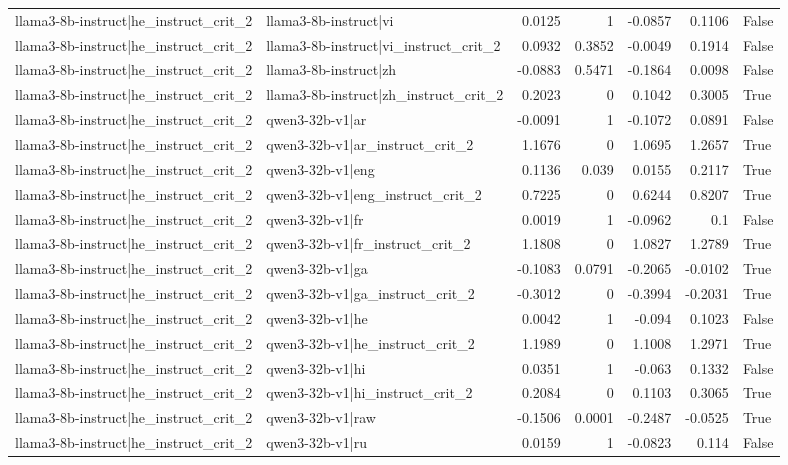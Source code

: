 \begin{table}
\begin{tabular}{l l r r r r l}
llama3-8b-instruct|he_instruct_crit_2 & llama3-8b-instruct|vi & 0.0125 & 1 & -0.0857 & 0.1106 & False \\
llama3-8b-instruct|he_instruct_crit_2 & llama3-8b-instruct|vi_instruct_crit_2 & 0.0932 & 0.3852 & -0.0049 & 0.1914 & False \\
llama3-8b-instruct|he_instruct_crit_2 & llama3-8b-instruct|zh & -0.0883 & 0.5471 & -0.1864 & 0.0098 & False \\
llama3-8b-instruct|he_instruct_crit_2 & llama3-8b-instruct|zh_instruct_crit_2 & 0.2023 & 0 & 0.1042 & 0.3005 & True \\
llama3-8b-instruct|he_instruct_crit_2 & qwen3-32b-v1|ar & -0.0091 & 1 & -0.1072 & 0.0891 & False \\
llama3-8b-instruct|he_instruct_crit_2 & qwen3-32b-v1|ar_instruct_crit_2 & 1.1676 & 0 & 1.0695 & 1.2657 & True \\
llama3-8b-instruct|he_instruct_crit_2 & qwen3-32b-v1|eng & 0.1136 & 0.039 & 0.0155 & 0.2117 & True \\
llama3-8b-instruct|he_instruct_crit_2 & qwen3-32b-v1|eng_instruct_crit_2 & 0.7225 & 0 & 0.6244 & 0.8207 & True \\
llama3-8b-instruct|he_instruct_crit_2 & qwen3-32b-v1|fr & 0.0019 & 1 & -0.0962 & 0.1 & False \\
llama3-8b-instruct|he_instruct_crit_2 & qwen3-32b-v1|fr_instruct_crit_2 & 1.1808 & 0 & 1.0827 & 1.2789 & True \\
llama3-8b-instruct|he_instruct_crit_2 & qwen3-32b-v1|ga & -0.1083 & 0.0791 & -0.2065 & -0.0102 & True \\
llama3-8b-instruct|he_instruct_crit_2 & qwen3-32b-v1|ga_instruct_crit_2 & -0.3012 & 0 & -0.3994 & -0.2031 & True \\
llama3-8b-instruct|he_instruct_crit_2 & qwen3-32b-v1|he & 0.0042 & 1 & -0.094 & 0.1023 & False \\
llama3-8b-instruct|he_instruct_crit_2 & qwen3-32b-v1|he_instruct_crit_2 & 1.1989 & 0 & 1.1008 & 1.2971 & True \\
llama3-8b-instruct|he_instruct_crit_2 & qwen3-32b-v1|hi & 0.0351 & 1 & -0.063 & 0.1332 & False \\
llama3-8b-instruct|he_instruct_crit_2 & qwen3-32b-v1|hi_instruct_crit_2 & 0.2084 & 0 & 0.1103 & 0.3065 & True \\
llama3-8b-instruct|he_instruct_crit_2 & qwen3-32b-v1|raw & -0.1506 & 0.0001 & -0.2487 & -0.0525 & True \\
llama3-8b-instruct|he_instruct_crit_2 & qwen3-32b-v1|ru & 0.0159 & 1 & -0.0823 & 0.114 & False \\

\end{tabular}
\end{table}
